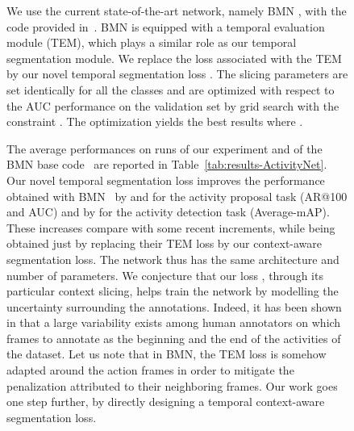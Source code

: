 \documentclass[10pt,twocolumn,letterpaper]{article}
\begin{document}
\begin{figure}[t]
{\begin{minipage}{\linewidth}
We use the current state-of-the-art network, namely BMN \cite{Lin_2019_ICCV}, with the code provided in~\cite{BMNCode}. BMN is equipped with a temporal evaluation module (TEM), which plays a similar role as our temporal segmentation module. We replace the loss associated with the TEM by our novel temporal segmentation loss . The slicing parameters are set identically for all the classes and are optimized with respect to the AUC performance on the validation set by grid search with the constraint . The optimization yields the best results where .



The average performances on  runs of our experiment and of the BMN base code~\cite{BMNCode} are reported in Table~\ref{tab:results-ActivityNet}. Our novel temporal segmentation loss improves the performance obtained with BMN~\cite{BMNCode} by  and  for the activity proposal task (AR@100 and AUC) and by  for the activity detection task (Average-mAP). These increases compare with some recent increments, while being obtained just by replacing their TEM loss by our context-aware segmentation loss. The network thus has the same architecture and number of parameters. We conjecture that our loss , through its particular context slicing, helps train the network by modelling the uncertainty surrounding the annotations. Indeed, it has been shown in \cite{alwassel2018diagnosing,sigurdsson2017actions} that a large variability exists among human annotators on which frames to annotate as the beginning and the end of the activities of the dataset. Let us note that in BMN, the TEM loss is somehow adapted around the action frames in order to mitigate the penalization attributed to their neighboring frames. Our work goes one step further, by directly designing a temporal context-aware segmentation loss.



\end{minipage}}
\end{figure}
\end{document}
